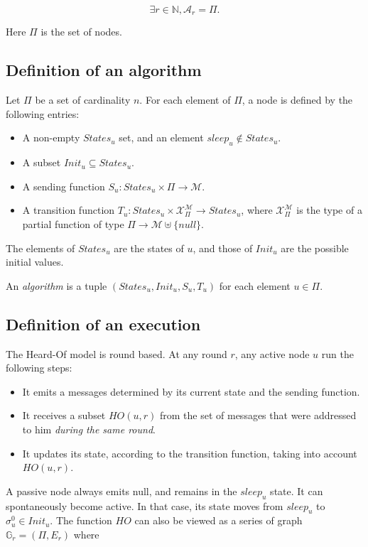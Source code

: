 \documentclass{article}
\begin{document}
$$\exists r \in \mathds{N}, \mathcal{A}_r = \Pi.$$

Here $\Pi$ is the set of nodes.

\subsection{Definition of an algorithm}

Let $\Pi$ be a set of cardinality $n$. For each element of $\Pi$, a node is defined by the following entries:

\begin{itemize}
	\item A non-empty $States_u$ set, and an element $sleep_u \notin States_u$.
	\item A subset $Init_u \subseteq States_u$.
	\item A sending function $S_u: States_u \times \Pi \rightarrow \mathcal{M}$.
	\item A transition function $T_u: States_u \times \mathcal{X}_\Pi^{\mathcal{M}} \rightarrow States_u$,
		where $\mathcal{X}_\Pi^{\mathcal{M}}$ is the type of a partial function
		of type $\Pi \rightarrow \mathcal{M} \uplus \{null\}$.
\end{itemize}

The elements of $States_u$ are the states of $u$, and those of $Init_u$ are the possible initial values.

An \textit{algorithm} is a tuple $(States_u, Init_u, S_u, T_u)$ for each element $u \in \Pi$.


\subsection{Definition of an execution}

The Heard-Of model is round based. At any round $r$, any active node $u$ run the following steps:

\begin{itemize}
	\item It emits a messages determined by its current state and the sending function.
	\item It receives a subset $HO(u,r)$ from the set of messages that were addressed to him
		\textit{during the same round}.
	\item It updates its state, according to the transition function, taking into account $HO(u,r)$.
\end{itemize}

A passive node always emits null, and remains in the $sleep_u$ state.
It can spontaneously become active. In that case, its state moves from $sleep_u$ to $\sigma^0_u \in Init_u$.
The function $HO$ can also be viewed as a series of graph $\mathds{G}_r = (\Pi, E_r)$ where
\end{document}
